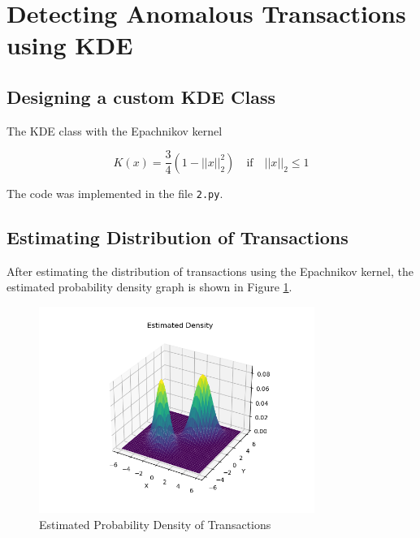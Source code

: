 \section{Detecting Anomalous Transactions using KDE}

\subsection{Designing a custom KDE Class}

The KDE class with the Epachnikov kernel

\begin{equation}
    K(x) = \frac{3}{4} (1 - ||x||_2^2) \quad \text{if} \quad ||x||_2 \leq 1
\end{equation}

The code was implemented in the file \texttt{2.py}.

\subsection{Estimating Distribution of Transactions}

After estimating the distribution of transactions using the Epachnikov kernel, the estimated probability density graph is shown in Figure \ref{fig:q2_1}.

\begin{figure}[H]
    \centering
    \includegraphics[width=0.8\textwidth]{../q2/images/transaction distribution.png}
    \caption{Estimated Probability Density of Transactions}
    \label{fig:q2_1}
\end{figure}

\newpage